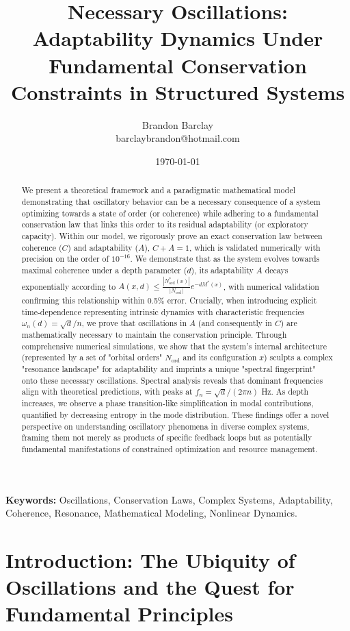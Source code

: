 \documentclass[11pt,a4paper]{article}
\title{\LARGE\bf Necessary Oscillations: Adaptability Dynamics Under Fundamental Conservation Constraints in Structured Systems}
\author{Brandon Barclay\\
\normalsize{barclaybrandon@hotmail.com}}
\date{\today}
\begin{document}
\maketitle

\begin{abstract}
We present a theoretical framework and a paradigmatic mathematical model demonstrating that oscillatory behavior can be a necessary consequence of a system optimizing towards a state of order (or coherence) while adhering to a fundamental conservation law that links this order to its residual adaptability (or exploratory capacity). Within our model, we rigorously prove an exact conservation law between coherence ($C$) and adaptability ($A$), $C+A=1$, which is validated numerically with precision on the order of $10^{-16}$. We demonstrate that as the system evolves towards maximal coherence under a depth parameter ($d$), its adaptability $A$ decays exponentially according to $A(x,d) \leq \frac{|N_{\text{ord}}^*(x)|}{|N_{\text{ord}}|} e^{-d M^*(x)}$, with numerical validation confirming this relationship within 0.5\% error. Crucially, when introducing explicit time-dependence representing intrinsic dynamics with characteristic frequencies $\omega_n(d) = \sqrt{d}/n$, we prove that oscillations in $A$ (and consequently in $C$) are mathematically necessary to maintain the conservation principle. Through comprehensive numerical simulations, we show that the system's internal architecture (represented by a set of "orbital orders" $N_{\text{ord}}$ and its configuration $x$) sculpts a complex "resonance landscape" for adaptability and imprints a unique "spectral fingerprint" onto these necessary oscillations. Spectral analysis reveals that dominant frequencies align with theoretical predictions, with peaks at $f_n = \sqrt{d}/(2\pi n)$ Hz. As depth increases, we observe a phase transition-like simplification in modal contributions, quantified by decreasing entropy in the mode distribution. These findings offer a novel perspective on understanding oscillatory phenomena in diverse complex systems, framing them not merely as products of specific feedback loops but as potentially fundamental manifestations of constrained optimization and resource management.
\end{abstract}

\textbf{Keywords:} Oscillations, Conservation Laws, Complex Systems, Adaptability, Coherence, Resonance, Mathematical Modeling, Nonlinear Dynamics.

\section{Introduction: The Ubiquity of Oscillations and the Quest for Fundamental Principles}
\end{document}
